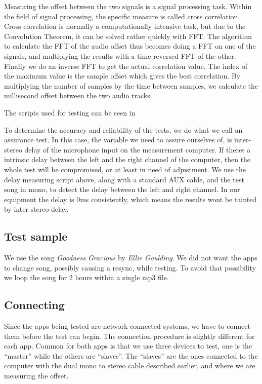 Measuring the offset between the two signals is a signal processing
task. Within the field of signal processing, the specific measure is
called cross correlation. Cross correlation is normally
a computationally intensive task, but due to the Convolution
Theorem\cite{conv_theo}, it can be solved rather quickly with \ac{FFT}.
The algorithm to calculate the \ac{FFT} of the audio offset thus becomes
doing a \ac{FFT} on one of the signals, and multiplying the results with
a time reversed \ac{FFT} of the other. Finally we do an inverse \ac{FFT}
to get the actual correlation value. The index of the maximum value is
the sample offset which gives the best correlation. By multiplying the
number of samples by the time between samples, we calculate the
millisecond offset between the two audio tracks.

The scripts used for testing can be seen in 

To determine the accuracy and reliability of the tests, we do what we
call an assurance test. In this case, the variable we need to assure
ourselves of, is inter-stereo delay of the microphone input on the
measurement computer. If theres a intrinsic delay between the left and
the right channel of the computer, then the whole test will be
compromised, or at least in need of adjustment. We use the delay
measuring script above, along with a standard AUX cable, and the test song in mono, to detect the delay
between the left and right channel. In our equipment the delay is 0ms
consistently, which means the results wont be tainted by inter-stereo
delay.

\subsection{Test sample}
We use the song \textit{Goodness Gracious} by \textit{Ellie Goulding}.  We did not
want the apps to change song, possibly causing a resync, while testing.
To avoid that possibility we loop the song for 2 hours within
a single mp3 file.

\subsection{Connecting}
Since the apps being tested are network connected systems, we have to
connect them before the test can begin. The connection procedure is
slightly different for each app. Common for both apps is that we use
three devices to test, one is the ``master'' while the others are
``slaves''. The ``slaves'' are the ones connected to the computer
with the dual mono to stereo cable described earlier, and where we are
measuring the offset.

